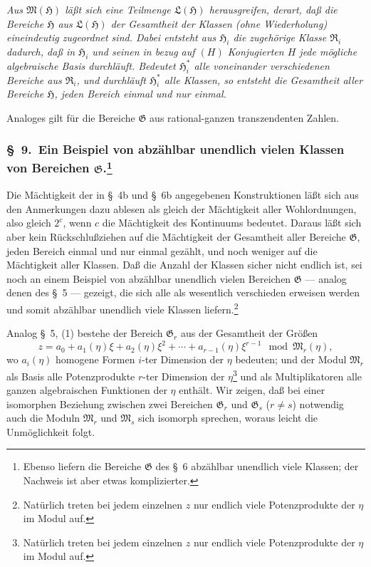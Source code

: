 \documentclass[12pt,a4paper]{article}
\begin{document}
\emph{Aus $\mathfrak{M}(\mathfrak{H})$ l\"a\ss t sich eine Teilmenge $\mathfrak{L}(\mathfrak{H})$ herausgreifen, derart, da\ss{} die Bereiche $\mathfrak{H}$ aus $\mathfrak{L}(\mathfrak{H})$ der Gesamtheit der Klassen (ohne Wiederholung) eineindeutig zugeordnet sind. Dabei entsteht aus $\mathfrak{H}_i$ die zugeh\"orige Klasse $\mathfrak{R}_i$ dadurch, da\ss{} in $\mathfrak{H}_i$ und seinen in bezug auf $(H)$ Konjugierten $H$ jede m\"ogliche algebraische Basis durchl\"auft. Bedeutet $\mathfrak{H}_i^*$ alle voneinander verschiedenen Bereiche aus $\mathfrak{R}_i$, und durchl\"auft $\mathfrak{H}_i^*$ alle Klassen, so entsteht die Gesamtheit aller Bereiche $\mathfrak{H}$, jeden Bereich einmal und nur einmal.}

Analoges gilt f\"ur die Bereiche $\mathfrak{G}$ aus rational-ganzen transzendenten Zahlen.

\subsubsection*{\S\ 9.\ Ein Beispiel von abz\"ahlbar unendlich vielen Klassen von Bereichen $\mathfrak{G}$.\footnote{Ebenso liefern die Bereiche $\mathfrak{G}$ des \S\ 6 abz\"ahlbar unendlich viele Klassen; der Nachweis ist aber etwas komplizierter.}}

Die M\"achtigkeit der in \S\ 4b und \S\ 6b angegebenen Konstruktionen l\"a\ss t sich aus den Anmerkungen dazu ablesen als gleich der M\"achtigkeit aller Wohlordnungen, also gleich $2^c$, wenn $c$ die M\"achtigkeit des Kontinuums bedeutet. Daraus l\"a\ss t sich aber kein R\"uckschlu\ss ziehen auf die M\"achtigkeit der Gesamtheit aller Bereiche $\mathfrak{G}$, jeden Bereich einmal und nur einmal gez\"ahlt, und noch weniger auf die M\"achtigkeit aller Klassen. Da\ss{} die Anzahl der Klassen sicher nicht endlich ist, sei noch an einem Beispiel von abz\"ahlbar unendlich vielen Bereichen $\mathfrak{G}$ --- analog denen des \S\ 5 --- gezeigt, die sich alle als wesentlich verschieden erweisen werden und somit abz\"ahlbar unendlich viele Klassen liefern.\footnote{Nat\"urlich treten bei jedem einzelnen $z$ nur endlich viele Potenzprodukte der $\eta$ im Modul auf.}

Analog \S\ 5, (1) bestehe der Bereich $\mathfrak{G}_r$ aus der Gesamtheit der Gr\"o\ss en
\begin{equation}\tag{1}
z = a_0 + a_1(\eta) \xi + a_2(\eta) \xi^2 + \cdots + a_{r-1}(\eta) \xi^{r-1} \mod \mathfrak{M}_r(\eta),\end{equation}
wo $a_i(\eta)$ homogene Formen $i$-ter Dimension der $\eta$ bedeuten; und der Modul $\mathfrak{M}_r$ als Basis alle Potenzprodukte $r$-ter Dimension der $\eta$\footnote{Nat\"urlich treten bei jedem einzelnen $z$ nur endlich viele Potenzprodukte der $\eta$ im Modul auf.} und als Multiplikatoren alle ganzen algebraischen Funktionen der $\eta$ enth\"alt. Wir zeigen, da\ss{} bei einer isomorphen Beziehung zwischen zwei Bereichen $\mathfrak{G}_r$ und $\mathfrak{G}_s$ ($r \neq s$) notwendig auch die Moduln $\mathfrak{M}_r$ und $\mathfrak{M}_s$ sich isomorph sprechen, woraus leicht die Unm\"oglichkeit folgt.
\end{document}
